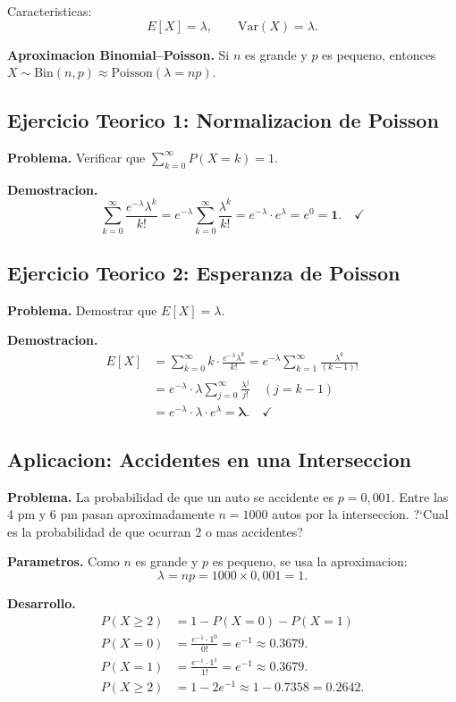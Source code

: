\documentclass[12pt,a4paper]{article}
\begin{document}
Caracteristicas:
\[
  E[X] = \lambda, \qquad \mathrm{Var}(X) = \lambda.
\]

\textbf{Aproximacion Binomial--Poisson.} Si $n$ es grande y $p$ es pequeno, entonces
$X \sim \mathrm{Bin}(n,p) \approx \mathrm{Poisson}(\lambda = np)$.

\subsection{Ejercicio Teorico 1: Normalizacion de Poisson}

\textbf{Problema.} Verificar que $\displaystyle\sum_{k=0}^{\infty} P(X=k) = 1$.

\textbf{Demostracion.}
\[
  \sum_{k=0}^{\infty} \frac{e^{-\lambda}\lambda^k}{k!}
  = e^{-\lambda}\sum_{k=0}^{\infty}\frac{\lambda^k}{k!}
  = e^{-\lambda}\cdot e^{\lambda} = e^{0} = \mathbf{1}.\quad\checkmark
\]

\subsection{Ejercicio Teorico 2: Esperanza de Poisson}

\textbf{Problema.} Demostrar que $E[X] = \lambda$.

\textbf{Demostracion.}
\begin{align*}
  E[X] &= \sum_{k=0}^{\infty} k\cdot\frac{e^{-\lambda}\lambda^k}{k!}
         = e^{-\lambda}\sum_{k=1}^{\infty}\frac{\lambda^k}{(k-1)!} \\
       &= e^{-\lambda}\cdot\lambda\sum_{j=0}^{\infty}\frac{\lambda^j}{j!} \quad (j=k-1) \\
       &= e^{-\lambda}\cdot\lambda\cdot e^{\lambda} = \boldsymbol{\lambda}.\quad\checkmark
\end{align*}

\subsection{Aplicacion: Accidentes en una Interseccion}

\textbf{Problema.} La probabilidad de que un auto se accidente es $p = 0{,}001$.
Entre las 4 pm y 6 pm pasan aproximadamente $n = 1000$ autos por la interseccion.
?`Cual es la probabilidad de que ocurran 2 o mas accidentes?

\textbf{Parametros.} Como $n$ es grande y $p$ es pequeno, se usa la aproximacion:
\[
  \lambda = np = 1000 \times 0{,}001 = 1.
\]

\textbf{Desarrollo.}
\begin{align*}
  P(X \geq 2) &= 1 - P(X = 0) - P(X = 1) \\[4pt]
  P(X = 0) &= \frac{e^{-1}\cdot 1^0}{0!} = e^{-1} \approx 0.3679. \\[4pt]
  P(X = 1) &= \frac{e^{-1}\cdot 1^1}{1!} = e^{-1} \approx 0.3679. \\[4pt]
  P(X \geq 2) &= 1 - 2e^{-1} \approx 1 - 0.7358 = \mathbf{0.2642}.
\end{align*}
\end{document}
